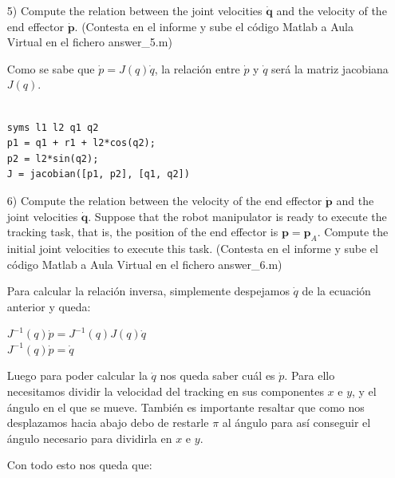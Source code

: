 \documentclass[a4paper]{article}
\begin{document}
\begin{itemize}
\item[5)]
 {\color{gray} Compute the relation between the joint velocities $\dot{\mathbf{q}}$ 
and the velocity of the end effector $\dot{\mathbf{p}}$. (Contesta en el informe y sube el c\'odigo Matlab a Aula Virtual en el fichero answer\_5.m)}

\bigskip

Como se sabe que $\dot{p} = J(q)\dot{q}$, la relación entre $\dot{p}$ y $\dot{q}$ será la matriz jacobiana $J(q)$.

\bigskip

\begin{tcolorbox}[width=12cm, title={File \texttt{answer\_5.m}}]
\begin{scriptsize}
\begin{verbatim}

syms l1 l2 q1 q2
p1 = q1 + r1 + l2*cos(q2);
p2 = l2*sin(q2);
J = jacobian([p1, p2], [q1, q2])

\end{verbatim}
\end{scriptsize}
\end{tcolorbox}


\item[6)]
 {\color{gray} Compute the relation between the velocity of the end effector $\dot{\mathbf{p}}$ and the joint velocities $\dot{\mathbf{q}}$. 
Suppose that the robot manipulator is ready to execute the tracking task, that is, the position of the end effector is $\mathbf{p} =\mathbf{p} _A$. Compute the initial joint velocities to execute this task. (Contesta en el informe y sube el c\'odigo Matlab a Aula Virtual en el fichero answer\_6.m)}

\bigskip

Para calcular la relación inversa, simplemente despejamos $\dot{q}$ de la ecuación anterior y queda:

\begin{center}
	$J^{-1}(q)\dot{p} = J^{-1}(q)J(q)\dot{q}$\\
	$J^{-1}(q)\dot{p} = \dot{q}$
\end{center}

Luego para poder calcular la $\dot{q}$ nos queda saber cuál es $\dot{p}$. Para ello necesitamos dividir la velocidad del tracking en sus componentes $x$ e $y$, y el ángulo en el que se mueve. También es importante resaltar que como nos desplazamos hacia abajo debo de restarle $\pi$ al ángulo para así conseguir el ángulo necesario para dividirla en $x$ e $y$.

Con todo esto nos queda que:


\end{itemize}
\end{document}
